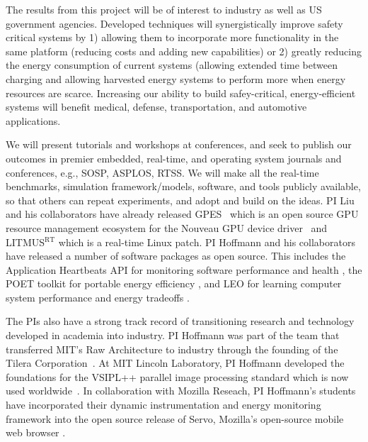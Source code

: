 
The results from this project will be of interest to industry as well
as US government agencies.  Developed techniques will synergistically
improve safety critical systems by 1) allowing them to incorporate
more functionality in the same platform (reducing costs and adding new
capabilities) or 2) greatly reducing the energy consumption of current
systems (allowing extended time between charging and allowing
harvested energy systems to perform more when energy resources are
scarce.  Increasing our ability to build safey-critical,
energy-efficient systems will benefit medical, defense,
transportation, and automotive applications.  

 We will present tutorials and workshops at
conferences, and seek to publish our outcomes in premier embedded,
real-time, and operating system journals and conferences, e.g., SOSP,
ASPLOS, RTSS.  We will make all the real-time benchmarks, simulation
framework/models, software, and tools publicly available, so that
others can repeat experiments, and adopt and build on the ideas.  PI
Liu and his collaborators have already released GPES~\cite{GPES} which
is an open source GPU resource management ecosystem for the Nouveau
GPU device driver~\cite{Nouveau} and LITMUS$^{\textrm{RT}}$
\cite{LITMUS} which is a real-time Linux patch.  PI Hoffmann and his
collaborators have released a number of software packages as open
source.  This includes the Application Heartbeats API for monitoring
software performance and health
\cite{seec-cdc2010,HB-GOOGLE,icac2010heartbeats}, the POET toolkit for
portable energy efficiency \cite{POET,poetweb}, and LEO for learning
computer system performance and energy tradeoffs \cite{LEO,leoweb}.

The PIs also have a strong track record of transitioning research and
technology developed in academia into industry. PI Hoffmann was part of the team that
transferred MIT's Raw Architecture to industry through the founding of
the Tilera Corporation~\cite{tilera1,tilera2}.  At MIT Lincoln Laboratory, PI
Hoffmann developed the foundations for the VSIPL++ parallel image
processing standard which is now used worldwide~\cite{VSIPL++}.  In
collaboration with Mozilla Reseach, PI Hoffmann's students have
incorporated their dynamic instrumentation and energy monitoring
framework into the open source release of Servo, Mozilla's open-source
mobile web browser \cite{servo-article}.


